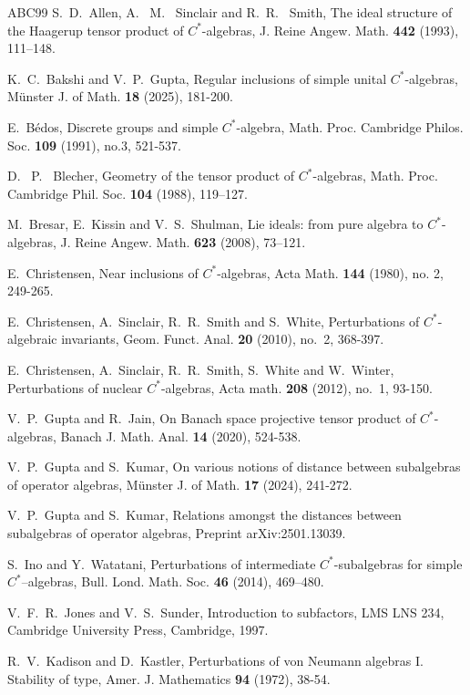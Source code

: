 \documentclass{amsart}
\numberwithin{equation}{section}
\newcommand{\1}{\mathbf{1}}
\begin{document}
\begin{thebibliography}{ABC99}
 S.~D.~Allen, A.~ M.~ Sinclair and R.~R.~ Smith, The
  ideal structure of the Haagerup tensor product of $C^*$-algebras,
  J. Reine Angew. Math. {\bf 442} (1993), 111–148.

  
 K.~C.~Bakshi and V.~P.~Gupta, Regular inclusions of
  simple unital $C^*$-algebras, Münster J. of Math. {\bf 18} (2025),
  181-200.

 E.~B\'{e}dos, Discrete groups and simple $C^*$-algebra,
  Math. Proc. Cambridge Philos. Soc. {\bf 109} (1991), no.3, 521-537.

 D.~ P.~ Blecher, Geometry of the tensor product of
  $C^*$-algebras, Math. Proc. Cambridge Phil. Soc. {\bf 104} (1988),
  119–127.

 M.~Bresar, E.~Kissin and V.~S.~Shulman, Lie ideals:
  from pure algebra to $C^*$-algebras, J. Reine Angew. Math. {\bf 623}
  (2008), 73–121.

 E.~Christensen, Near inclusions of $C^*$-algebras, Acta
  Math. {\bf 144} (1980), no. 2, 249-265.

 E.~Christensen, A.~Sinclair, R.~R.~Smith and S.~White,
  Perturbations of $C^*$-algebraic invariants, Geom. Funct. Anal. {\bf
    20} (2010), no.~2, 368-397.

 E.~Christensen, A.~Sinclair, R.~R.~Smith, S.~White and
  W.~Winter, Perturbations of nuclear $C^*$-algebras, Acta math. {\bf
    208} (2012), no.~1, 93-150.

 V.~P.~Gupta and R.~Jain, On Banach space projective
  tensor product of $C^*$-algebras, Banach J. Math. Anal. {\bf 14}
  (2020), 524-538.

 V.~P.~Gupta and S.~Kumar, On various notions of distance
  between subalgebras of operator algebras, M\"{u}nster J. of
  Math. {\bf 17} (2024), 241-272.
 
 V.~P.~Gupta and S.~Kumar, Relations amongst the
  distances between subalgebras of operator algebras, Preprint
  arXiv:2501.13039.

 S.~Ino and Y.~Watatani, Perturbations of intermediate
  $C^*$-subalgebras for simple $C^*$–algebras, Bull.
  Lond. Math. Soc. {\bf 46} (2014), 469–480.

 V.~F.~R.~Jones and V.~S.~Sunder, Introduction to
  subfactors, LMS LNS 234, Cambridge University Press, Cambridge,
  1997.

 R.~V.~Kadison and D.~Kastler, Perturbations of von
  Neumann algebras I. Stability of type, Amer. J. Mathematics {\bf 94}
  (1972), 38-54.


\end{thebibliography}
\end{document}
